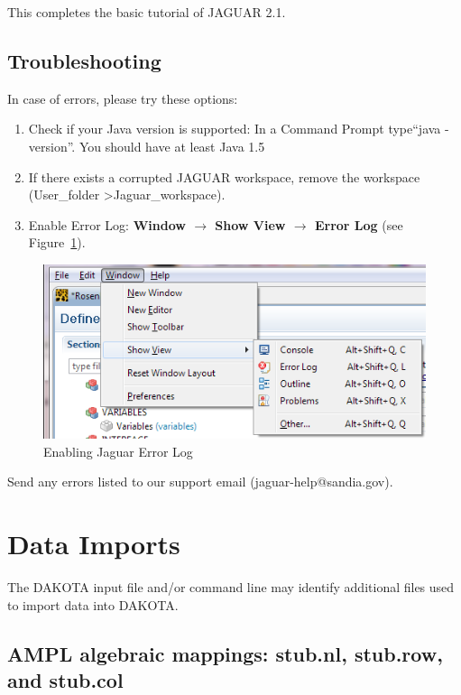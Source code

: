 This completes the basic tutorial of JAGUAR 2.1.

\subsection{Troubleshooting}

In case of errors, please try these options:
\begin{enumerate}
\item  Check if your Java version is supported: In a Command Prompt type``java -version''. You should have at least Java 1.5
\item  If there exists a corrupted JAGUAR workspace, remove the workspace (User\_folder \textgreater Jaguar\_workspace).
\item  Enable Error Log: {\bf Window $\rightarrow$ Show View $\rightarrow$ Error Log} (see Figure~\ref{fig:input:11ShowView}).
\end{enumerate}

\begin{figure}[htbp]
  \centering
  \includegraphics[scale=0.6]{images/11ShowView}
  \caption{Enabling Jaguar Error Log}
  \label{fig:input:11ShowView}
\end{figure}


Send any errors listed to our support email (jaguar-help@sandia.gov).

\newpage
\section{Data Imports}\label{input:import}

The DAKOTA input file and/or command line may identify additional
files used to import data into DAKOTA.

\subsection{AMPL algebraic mappings: stub.nl, stub.row, and stub.col}

